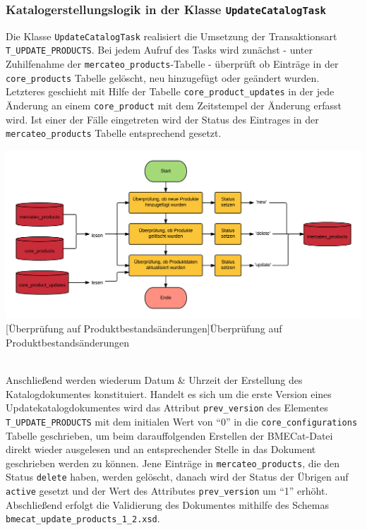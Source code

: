 	\subsubsection{Katalogerstellungslogik in der Klasse \texttt{UpdateCatalogTask} }
    Die	Klasse \texttt{UpdateCatalogTask} realisiert die Umsetzung der Transaktionsart
	\texttt{T\_UPDATE\_PRODUCTS}.
	Bei jedem  Aufruf des Tasks wird zunächst - unter Zuhilfenahme der \texttt{mercateo\_products}-Tabelle - überprüft ob Einträge in der \texttt{core\_products} Tabelle gelöscht, neu hinzugefügt oder geändert wurden. Letzteres geschieht mit Hilfe der Tabelle \texttt{core\_product\_updates} in der jede Änderung an einem \texttt{core\_product} mit dem Zeitstempel der Änderung erfasst wird. Ist einer der Fälle eingetreten wird der Status des Eintrages in der \texttt{mercateo\_products} Tabelle entsprechend gesetzt. \\
	\begin{minipage}{\linewidth}
		\vspace{1em}
		\centering
		\includegraphics[width=1 \linewidth]{img/productChangeCheck}
		[Überprüfung auf Produktbestandsänderungen]{Überprüfung auf Produktbestandsänderungen}
		\vspace{1em}
	\end{minipage}\\
	
	
	Anschließend werden wiederum Datum \& Uhrzeit der Erstellung des Katalogdokumentes konstituiert.
	Handelt es sich um die erste Version eines Updatekatalogdokumentes wird das Attribut \texttt{prev\_version} des Elementes \texttt{T\_UPDATE\_PRODUCTS} mit dem initialen Wert von \enquote{0} in die \texttt{core\_configurations} Tabelle geschrieben, um beim darauffolgenden Erstellen der BMECat-Datei direkt wieder ausgelesen und an entsprechender Stelle in das Dokument geschrieben werden zu können.
	Jene Einträge in \texttt{mercateo\_products}, die den Status \texttt{delete} haben, werden gelöscht, danach wird der Status der Übrigen auf \texttt{active} gesetzt und  der Wert des Attributes \texttt{prev\_version} um \enquote{1} erhöht. Abschließend erfolgt die Validierung des Dokumentes mithilfe des Schemas \texttt{bmecat\_update\_products\_1\_2.xsd}.
	
